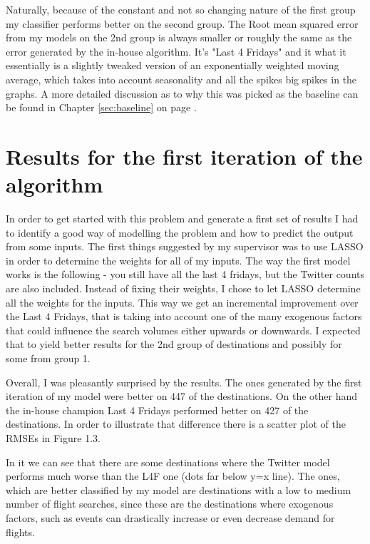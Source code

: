 \documentclass[minf,frontabs,twoside,singlespacing,parskip]{infthesis}
\begin{document}
Naturally, because of the constant and not so changing nature of the first group my classifier performs better on the second group. The Root mean squared error from my models on the 2nd group is always smaller or roughly the same as the error generated by the in-house algorithm. It's  "Last 4 Fridays" and it what it essentially is a slightly tweaked version of an exponentially weighted moving average, which takes into account seasonality and all the spikes big spikes in the graphs. A more detailed discussion as to why this was picked as the baseline can be found in Chapter \ref{sec:baseline} on page \pageref{sec:baseline}.

\section{Results for the first iteration of the algorithm}

In order to get started with this problem and generate a first set of results I had to identify a good way of modelling the problem and how to predict the output from some inputs. The first things suggested by my supervisor was to use LASSO \cite{lasso} in order to determine the weights for all of my inputs. The way the first model works is the following - you still have all the last 4 fridays, but the Twitter counts are also included. Instead of fixing their weights, I chose to let LASSO determine all the weights for the inputs. This way we get an incremental improvement over the Last 4 Fridays, that is taking into account one of the many exogenous factors that could influence the search volumes either upwards or downwards. I expected that to yield better results for the 2nd group of destinations and possibly for some from group 1.

Overall, I was pleasantly surprised by the results. The ones generated by the first iteration of my model were better on 447 of the destinations. On the other hand the in-house champion Last 4 Fridays performed better on 427 of the destinations. In order to illustrate that difference there is a scatter plot of the RMSEs in Figure 1.3.


In it we can see that there are some destinations where the Twitter model performs much worse than the L4F one (dots far below y=x line). The ones, which are better classified by my model are destinations with a low to medium number of flight searches, since these are the destinations where exogenous factors, such as events can drastically increase or even decrease demand for flights.
\end{document}
